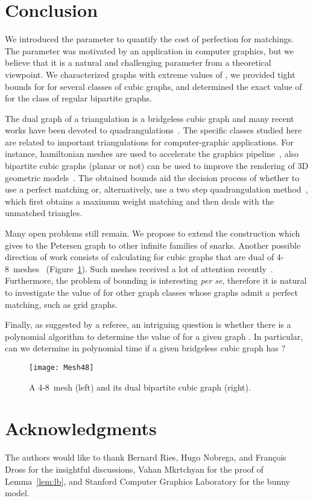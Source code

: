 \documentclass{article}
\begin{document}
\section{Conclusion}

We introduced the parameter  to quantify the cost of perfection for matchings. The parameter was motivated by an application in computer graphics, but we believe that it is a natural and challenging parameter from a theoretical viewpoint. We characterized graphs with extreme values of , we provided tight bounds for  for several classes of cubic graphs, and determined the exact value of  for the class of regular bipartite graphs.

The dual graph of a triangulation is a bridgeless cubic graph and many recent works have been devoted to quadrangulations~\cite{gopi04,remacle11,daniels11,tri2quad,lizier10a}.
The specific classes studied here are related to important triangulations for computer-graphic applications. 
For instance, hamiltonian  meshes are used to accelerate the graphics pipeline~\cite{arkin96,eppstein04}, also bipartite cubic graphs (planar or not) can be used to improve the rendering of 3D geometric models~\cite{sander08}. 
The obtained bounds aid the decision process of whether to use a perfect matching or, alternatively, use a two step quadrangulation method~\cite{tarini10}, which first obtains a maximum weight matching and then deals with the unmatched triangles.

Many open problems still remain.
We propose to extend the construction which gives  to the Petersen graph to other infinite families of snarks.
Another possible direction of work consists of calculating  for cubic graphs that are dual of 4-8~meshes~\cite{velho01,velho03,velho04} (Figure~\ref{fig:48mesh}). Such meshes received a lot of attention recently~\cite{amorim12,goes08,weber07,goldenstein05}.
Furthermore, the problem of bounding  is interesting \emph{per se}, therefore it is natural to investigate the value of  for other graph classes whose graphs admit a perfect matching, such as grid graphs.

Finally, as suggested by a referee, an intriguing question is whether there is a polynomial algorithm to determine the value of  for a given graph . In particular, can we determine in polynomial time if a given bridgeless cubic graph  has ?

\begin{figure}[ht]
\centering
\texttt{[image: Mesh48]}
\caption{A 4-8~mesh (left) and its dual bipartite cubic graph (right).}
\label{fig:48mesh}
\end{figure}

\section*{Acknowledgments}

The authors would like to thank Bernard Ries, Hugo Nobrega, and Fran\c{c}ois Dross for the insightful discussions,
Vahan Mkrtchyan for the proof of Lemma~\ref{lem:lb}, and Stanford Computer
Graphics Laboratory for the bunny model.



\end{document}
